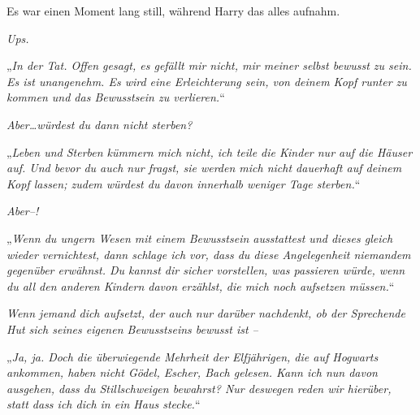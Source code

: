 Es war einen Moment lang still, während Harry das alles aufnahm.

\emph{Ups.}


„\emph{In der Tat. Offen gesagt, es gefällt mir nicht, mir meiner selbst bewusst zu sein. Es ist unangenehm. Es wird eine Erleichterung sein, von deinem Kopf runter zu kommen und das Bewusstsein zu verlieren.}“

\emph{Aber…würdest du dann nicht sterben?}

„\emph{Leben und Sterben kümmern mich nicht, ich teile die Kinder nur auf die Häuser auf. Und bevor du auch nur fragst, sie werden mich nicht dauerhaft auf deinem Kopf lassen; zudem würdest du davon innerhalb weniger Tage sterben.}“

\emph{Aber–!}

„\emph{Wenn du ungern Wesen mit einem Bewusstsein ausstattest und dieses gleich wieder vernichtest, dann schlage ich vor, dass du diese Angelegenheit niemandem gegenüber erwähnst. Du kannst dir sicher vorstellen, was passieren würde, wenn du all den anderen Kindern davon erzählst, die mich noch aufsetzen müssen.}“

\emph{Wenn jemand dich aufsetzt, der auch nur darüber \emph{nachdenkt}, ob der Sprechende Hut sich seines eigenen Bewusstseins bewusst ist –}

„\emph{Ja, ja. Doch die überwiegende Mehrheit der Elfjährigen, die auf Hogwarts ankommen, haben nicht \emph{Gödel, Escher, Bach} gelesen. Kann ich nun davon ausgehen, dass du Stillschweigen bewahrst? Nur \emph{deswegen} reden wir hierüber, statt dass ich dich in ein Haus stecke.}“

